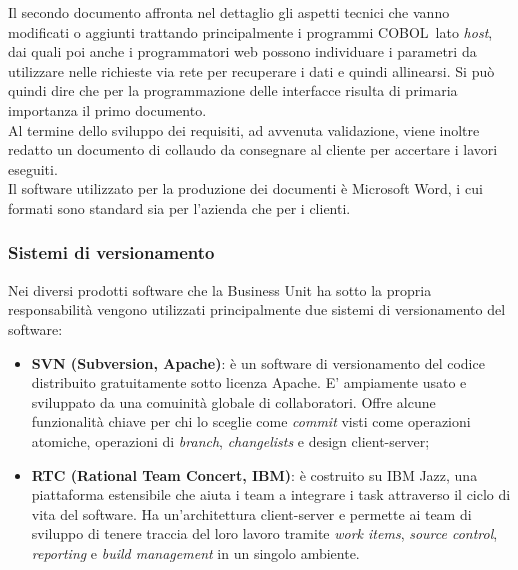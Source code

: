 	
	Il secondo documento affronta nel dettaglio gli aspetti tecnici che vanno modificati o aggiunti trattando principalmente i programmi COBOL\glossario\ lato \textit{host}, dai quali poi anche i programmatori web possono individuare i parametri da utilizzare nelle richieste via rete per recuperare i dati e quindi allinearsi. Si può quindi dire che per la programmazione delle interfacce risulta di primaria importanza il primo documento. \\
	
	Al termine dello sviluppo dei requisiti, ad avvenuta validazione, viene inoltre redatto un documento di collaudo da consegnare al cliente per accertare i lavori eseguiti. \\
	
	Il software utilizzato per la produzione dei documenti è Microsoft Word, i cui formati sono standard sia per l'azienda che per i clienti.
	
	
	\subsubsection{Sistemi di versionamento}

	Nei diversi prodotti software che la Business Unit ha sotto la propria responsabilità vengono utilizzati principalmente due sistemi di versionamento del software: 
	\begin{itemize}
		\item \textbf{SVN (Subversion, Apache)}: è un software di versionamento del codice distribuito gratuitamente sotto licenza Apache. E' ampiamente usato e sviluppato da una comuinità	globale di collaboratori. Offre alcune funzionalità chiave per chi lo sceglie come \textit{commit} visti come operazioni atomiche, operazioni di \textit{branch}, \textit{changelists} e design client-server;
		\item \textbf{RTC (Rational Team Concert, IBM)}: è costruito su IBM Jazz, una piattaforma estensibile che aiuta i team a integrare i task attraverso il ciclo di vita del software.	Ha un'architettura client-server e permette ai team di sviluppo di tenere traccia del loro lavoro tramite \textit{work items}, \textit{source control}, \textit{reporting} e \textit{build management} in un singolo ambiente.
	\end{itemize}
	
